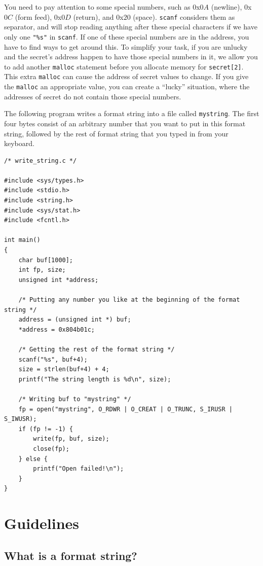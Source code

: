 You need to pay attention to some special numbers, such as 0x$0A$ (newline), 
0x$0C$ (form feed), 0x$0D$ (return), and 0x$20$ (space). 
{\tt scanf} considers them as separator, and will stop reading anything
after these special characters if we have only one {\tt "\%s"} in
{\tt scanf}.  If one of these special numbers are in the address, 
you have to find ways to get around this.
To simplify your task, if you are unlucky and the secret's address 
happen to have those special numbers in it, we allow you to add another {\tt malloc}
statement before you allocate memory for {\tt secret[2]}. This extra
{\tt malloc} can cause the address of secret values to change. If you
give the {\tt malloc} an appropriate value, you can 
create a ``lucky'' situation, where the addresses of secret do not 
contain those special numbers. 

The following program writes a format string into a file called {\tt mystring}.
The first four bytes consist of an arbitrary number that you want 
to put in this format string, followed by the rest of format string 
that you typed in from your keyboard.

\begin{lstlisting}
/* write_string.c */

#include <sys/types.h>
#include <stdio.h>
#include <string.h>
#include <sys/stat.h>
#include <fcntl.h>

int main()
{
    char buf[1000];
    int fp, size;
    unsigned int *address;
    
    /* Putting any number you like at the beginning of the format string */
    address = (unsigned int *) buf;
    *address = 0x804b01c;
    
    /* Getting the rest of the format string */
    scanf("%s", buf+4);
    size = strlen(buf+4) + 4;
    printf("The string length is %d\n", size);
    
    /* Writing buf to "mystring" */
    fp = open("mystring", O_RDWR | O_CREAT | O_TRUNC, S_IRUSR | S_IWUSR);
    if (fp != -1) {
        write(fp, buf, size);
        close(fp);
    } else {
        printf("Open failed!\n");
    }
}
\end{lstlisting}


\section{Guidelines} 


\subsection{What is a format string?}

